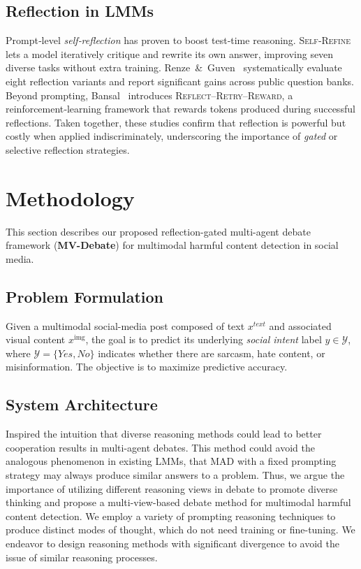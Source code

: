 \documentclass[letterpaper]{article} %
\begin{document}
\subsection{Reflection in LMMs}
Prompt‑level \emph{self‑reflection} has proven to boost test‑time reasoning.  
\textsc{Self‑Refine}~\cite{Madaan2023SelfRefine} lets a model iteratively critique and rewrite its own answer, improving seven diverse tasks without extra training.  
Renze~\&~Guven~\cite{Renze2024SelfReflection} systematically evaluate eight reflection variants and report significant gains across public question banks.  
Beyond prompting, Bansal~\cite{bensal2025reflect} introduces \textsc{Reflect--Retry--Reward}, a reinforcement‑learning framework that rewards tokens produced during successful reflections. 
Taken together, these studies confirm that reflection is powerful but costly when applied indiscriminately, underscoring the importance of \emph{gated} or selective reflection strategies.

\section{Methodology}
\label{sec:methodology}

This section describes our proposed reflection-gated multi-agent debate framework (\textbf{MV-Debate}) for multimodal harmful content detection in social media.


 
\subsection{Problem Formulation}
\label{subsec:problem_formulation}

Given a multimodal social-media post composed of text $x^{text}$ and associated visual content $x^\text{img}$, the goal is to predict its underlying \textit{social intent} label $y\in\mathcal{Y}$, where $\mathcal{Y}=\{Yes, No\}$ indicates whether there are sarcasm, hate content, or misinformation.
The objective is to maximize predictive accuracy. 



\subsection{System Architecture}
\label{subsec:system_architecture}


Inspired the intuition that diverse reasoning methods could lead to better cooperation results in multi-agent debates. This method could avoid the analogous phenomenon in
existing LMMs, that MAD with a fixed prompting strategy may always produce similar answers to a problem. Thus,
we argue the importance of utilizing different reasoning views in debate to promote diverse thinking
and propose a multi-view-based debate method for multimodal harmful content detection.  We employ a variety of prompting reasoning techniques to produce distinct modes of thought, which do not need training or fine-tuning. We endeavor to design reasoning methods with significant divergence to avoid the issue of similar reasoning processes.
\end{document}
